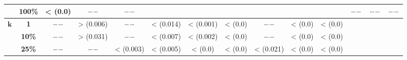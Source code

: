 \begin{table}[htbp]
{\begin{tabular}{cccccccccccccc}
			& \textbf{100\%} & < (0.0) & $\---$ & $\---$ &       &       &       &       &       &       & $\---$ & $\---$ & $\---$ \\
	  \midrule
	  \multirow{3}[2]{*}{$\bm{k}$} & \textbf{1} & $\---$ & > (0.006) & $\---$ & < (0.014) & < (0.001) & < (0.0) & $\---$ & < (0.0) & < (0.0) &       &       &  \\
			& \textbf{10\%} & $\---$ & > (0.031) & $\---$ & < (0.007) & < (0.002) & < (0.0) & $\---$ & < (0.0) & < (0.0) &       &       &  \\
			& \textbf{25\%} & $\---$ & $\---$ & < (0.003) & < (0.005) & < (0.0) & < (0.0) & < (0.021) & < (0.0) & < (0.0) &       &       &  \\
	  \bottomrule
	  \end{tabular}}%

\end{table}%
